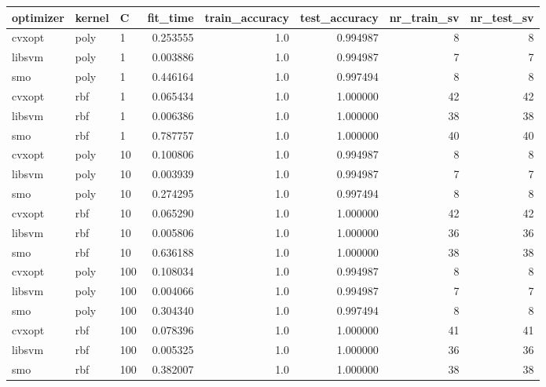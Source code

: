 \begin{tabular}{lllrrrrr}
\toprule
optimizer & kernel &   C &  fit\_time &  train\_accuracy &  test\_accuracy &  nr\_train\_sv &  nr\_test\_sv \\
\midrule
   cvxopt &   poly &   1 &  0.253555 &             1.0 &       0.994987 &            8 &           8 \\
   libsvm &   poly &   1 &  0.003886 &             1.0 &       0.994987 &            7 &           7 \\
      smo &   poly &   1 &  0.446164 &             1.0 &       0.997494 &            8 &           8 \\
   cvxopt &    rbf &   1 &  0.065434 &             1.0 &       1.000000 &           42 &          42 \\
   libsvm &    rbf &   1 &  0.006386 &             1.0 &       1.000000 &           38 &          38 \\
      smo &    rbf &   1 &  0.787757 &             1.0 &       1.000000 &           40 &          40 \\
   cvxopt &   poly &  10 &  0.100806 &             1.0 &       0.994987 &            8 &           8 \\
   libsvm &   poly &  10 &  0.003939 &             1.0 &       0.994987 &            7 &           7 \\
      smo &   poly &  10 &  0.274295 &             1.0 &       0.997494 &            8 &           8 \\
   cvxopt &    rbf &  10 &  0.065290 &             1.0 &       1.000000 &           42 &          42 \\
   libsvm &    rbf &  10 &  0.005806 &             1.0 &       1.000000 &           36 &          36 \\
      smo &    rbf &  10 &  0.636188 &             1.0 &       1.000000 &           38 &          38 \\
   cvxopt &   poly & 100 &  0.108034 &             1.0 &       0.994987 &            8 &           8 \\
   libsvm &   poly & 100 &  0.004066 &             1.0 &       0.994987 &            7 &           7 \\
      smo &   poly & 100 &  0.304340 &             1.0 &       0.997494 &            8 &           8 \\
   cvxopt &    rbf & 100 &  0.078396 &             1.0 &       1.000000 &           41 &          41 \\
   libsvm &    rbf & 100 &  0.005325 &             1.0 &       1.000000 &           36 &          36 \\
      smo &    rbf & 100 &  0.382007 &             1.0 &       1.000000 &           38 &          38 \\
\bottomrule
\end{tabular}
